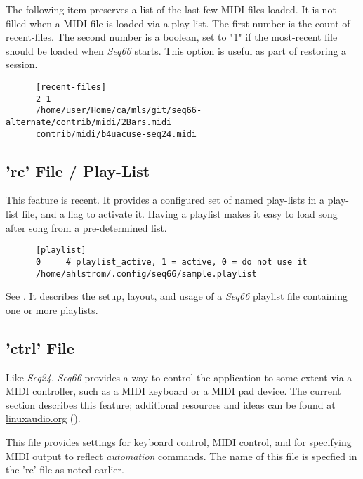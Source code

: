    The following item preserves a list of the last few MIDI files loaded.
   It is not filled when a MIDI file is loaded via a play-list.
   The first number is the count of recent-files.
   The second number is a boolean, set to "1" if the most-recent file
   should be loaded when \textsl{Seq66} starts.
   This option is useful as part of restoring a session.

   \begin{verbatim}
      [recent-files]
      2 1
      /home/user/Home/ca/mls/git/seq66-alternate/contrib/midi/2Bars.midi
      contrib/midi/b4uacuse-seq24.midi
   \end{verbatim}

\subsection{'rc' File / Play-List}
\label{subsec:configuration_playlist}

   This feature is recent.
   It provides a configured set of named play-lists in a play-list file,
   and a flag to activate it.
   Having a playlist makes it easy to load song after song from a pre-determined
   list.
   
   \index{[playlist]}
   \begin{verbatim}
      [playlist]
      0     # playlist_active, 1 = active, 0 = do not use it
      /home/ahlstrom/.config/seq66/sample.playlist
   \end{verbatim}

   See .
   It describes the setup, layout, and usage of a
   \textsl{Seq66} playlist file containing one or more playlists.

\subsection{'ctrl' File}
\label{subsec:configuration_ctrl}

   Like \textsl{Seq24}, \textsl{Seq66} provides a way to control the
   application to some extent via a MIDI controller, such as a MIDI keyboard or
   a MIDI pad device.  The current section describes this feature;
   additional resources and ideas can be found at \url{linuxaudio.org}
   (\cite{midicontrol}).

   This file provides settings for keyboard control, MIDI control, and for
   specifying MIDI output to reflect \textsl{automation} commands.
   The name of this file is specfied in the 'rc' file as noted earlier.

